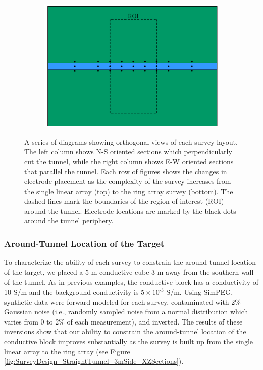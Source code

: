 \documentclass[preprint,authoryear,12pt]{elsarticle}
\begin{document}
\begin{figure}[htp]{}
\begin{center}
\begin{subfigure}{0.49\linewidth}
      \end{subfigure}\hspace{-0.9cm}
      \begin{subfigure}{0.49\linewidth}
         \label{fig:SurveyDesign_StraightTunnel_Layout_Ring_Y}
         \includegraphics[trim=0cm 0cm 0cm 0cm, clip=true,width=\linewidth]{./figures/Fig8f.pdf}
      \end{subfigure}
   \end{center}
\vspace{-0.4cm}
\caption{A series of diagrams showing orthogonal views of each survey layout. The left column shows N-S oriented sections which perpendicularly cut the tunnel, while the right column shows E-W oriented sections that parallel the tunnel. Each row of figures shows the changes in electrode placement as the complexity of the survey increases from the single linear array (top) to the ring array survey (bottom). The dashed lines mark the boundaries of the region of interest (ROI) around the tunnel. Electrode locations are marked by the black dots around the tunnel periphery.}
\label{fig:SurveyDesign_StraightTunnel_Layout}
\end{figure}


\subsubsection{Around-Tunnel Location of the Target}
\label{sec:RingArray_Development_Straight_Synth_AroundTunnel}

To characterize the ability of each survey to constrain the around-tunnel location of the target, we placed a 5 m conductive cube 3 m away from the southern wall of the tunnel. As in previous examples, the conductive block has a conductivity of 10 S/m and the background conductivity is $5 \times 10^{\text{-3}}$ S/m. Using SimPEG, synthetic data were forward modeled for each survey, contaminated with 2$\%$ Gaussian noise (i.e., randomly sampled noise from a normal distribution which varies from 0 to 2$\%$ of each measurement), and inverted. The results of these inversions show that our ability to constrain the around-tunnel location of the conductive block improves substantially as the survey is built up from the single linear array to the ring array (see Figure \ref{fig:SurveyDesign_StraightTunnel_3mSide_XZSections}).
\end{document}
